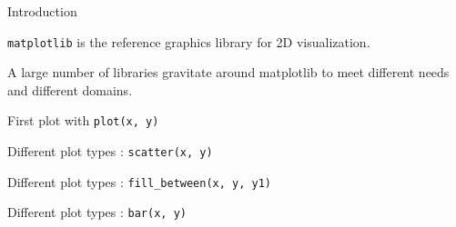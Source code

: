 \begin{frame}{Introduction}

    \texttt{matplotlib} is the reference graphics library for 2D visualization.
    
    A large number of libraries gravitate around matplotlib to meet different needs and different domains.
\end{frame}

\begin{frame}{First plot with \texttt{plot(x, y)}}
    \begin{minipage}[t]{0.49\linewidth}
    \end{minipage}
    \begin{minipage}[t]{0.49\linewidth}
        \vfill
    \end{minipage}
\end{frame}

\begin{frame}{Different plot types : \texttt{scatter(x, y)}}
    \begin{minipage}[t]{0.49\linewidth}
    \end{minipage}
    \begin{minipage}[t]{0.49\linewidth}
        \vfill
    \end{minipage}
\end{frame}

\begin{frame}{Different plot types : \texttt{fill\_between(x, y, y1)}}
    \begin{minipage}[t]{0.49\linewidth}
    \end{minipage}
    \begin{minipage}[t]{0.49\linewidth}
        \vfill
    \end{minipage}
\end{frame}

\begin{frame}{Different plot types : \texttt{bar(x, y)}}
    \begin{minipage}[t]{0.49\linewidth}
    \end{minipage}
    \begin{minipage}[t]{0.49\linewidth}
        \vfill
    \end{minipage}
\end{frame}

